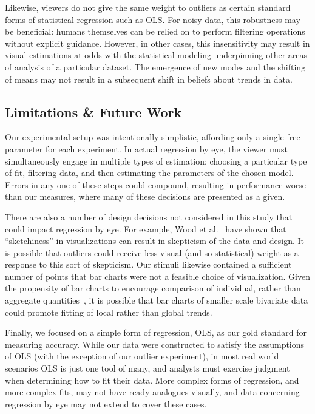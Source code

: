 \documentclass{sigchi}
\begin{document}
Likewise, viewers do not give the same weight to outliers as certain standard forms of statistical regression such as OLS. For noisy data, this robustness may be beneficial: humans themselves can be relied on to perform filtering operations without explicit guidance. However, in other cases, this insensitivity may result in visual estimations at odds with the statistical modeling underpinning other areas of analysis of a particular dataset. The emergence of new modes and the shifting of means may not result in a subsequent shift in beliefs about trends in data.

\subsection{Limitations \& Future Work}

Our experimental setup was intentionally simplistic, affording only a single free parameter for each experiment. In actual regression by eye, the viewer must simultaneously engage in multiple types of estimation: choosing a particular type of fit, filtering data, and then estimating the parameters of the chosen model. Errors in any one of these steps could compound, resulting in performance worse than our measures, where many of these decisions are presented as a given.

There are also a number of design decisions not considered in this study that could impact regression by eye. For example, Wood et al.~\cite{wood2012sketchy} have shown that ``sketchiness'' in visualizations can result in skepticism of the data and design. It is possible that outliers could receive less visual (and so statistical) weight as a response to this sort of skepticism. Our stimuli likewise contained a sufficient number of points that bar charts were not a feasible choice of visualization. Given the propensity of bar charts to encourage comparison of individual, rather than aggregate quantities~\cite{zacks1999bars}, it is possible that bar charts of smaller scale bivariate data could promote fitting of local rather than global trends.

Finally, we focused on a simple form of regression, OLS, as our gold standard for measuring accuracy. While our data were constructed to satisfy the assumptions of OLS (with the exception of our outlier experiment), in most real world scenarios OLS is just one tool of many, and analysts must exercise judgment when determining how to fit their data. More complex forms of regression, and more complex fits, may not have ready analogues visually, and data concerning regression by eye may not extend to cover these cases.
\end{document}
